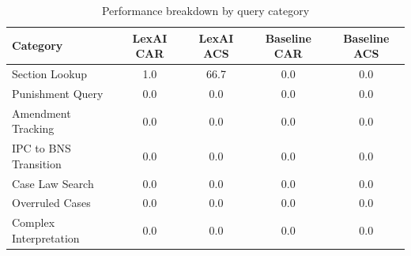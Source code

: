 \begin{table}[ht]
\centering
\caption{Performance breakdown by query category}
\label{tab:category_performance}
\begin{tabular}{lcccc}
\toprule
\textbf{Category} & \textbf{LexAI CAR} & \textbf{LexAI ACS} & \textbf{Baseline CAR} & \textbf{Baseline ACS} \\
\midrule
Section Lookup & 1.0 & 66.7 & 0.0 & 0.0 \\
Punishment Query & 0.0 & 0.0 & 0.0 & 0.0 \\
Amendment Tracking & 0.0 & 0.0 & 0.0 & 0.0 \\
IPC to BNS Transition & 0.0 & 0.0 & 0.0 & 0.0 \\
Case Law Search & 0.0 & 0.0 & 0.0 & 0.0 \\
Overruled Cases & 0.0 & 0.0 & 0.0 & 0.0 \\
Complex Interpretation & 0.0 & 0.0 & 0.0 & 0.0 \\
\bottomrule
\end{tabular}
\end{table}